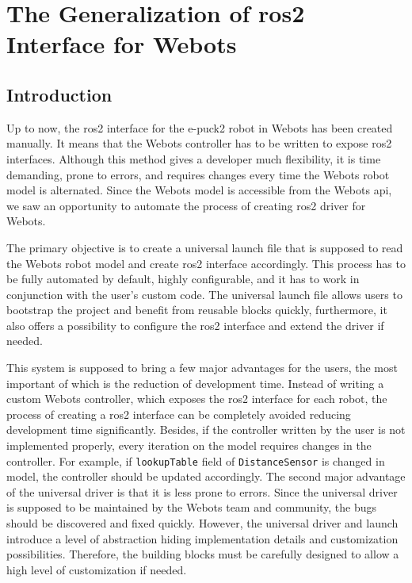 \chapter{The Generalization of \ac{ros2} Interface for Webots}
\label{chap:generalization}


\section{Introduction}
\label{sec:generalization:introduction}

Up to now, the \ac{ros2} interface for the e-puck2 robot in Webots has been created manually.
It means that the Webots controller has to be written to expose \ac{ros2} interfaces.
Although this method gives a developer much flexibility, it is time demanding, prone to errors, and requires changes every time the Webots robot model is alternated.
Since the Webots model is accessible from the Webots \ac{api}, we saw an opportunity to automate the process of creating \ac{ros2} driver for Webots.

The primary objective is to create a universal launch file that is supposed to read the Webots robot model and create \ac{ros2} interface accordingly.
This process has to be fully automated by default, highly configurable, and it has to work in conjunction with the user's custom code.
The universal launch file allows users to bootstrap the project and benefit from reusable blocks quickly, furthermore, it also offers a possibility to configure the \ac{ros2} interface and extend the driver if needed.

This system is supposed to bring a few major advantages for the users, the most important of which is the reduction of development time.
Instead of writing a custom Webots controller, which exposes the \ac{ros2} interface for each robot, the process of creating a \ac{ros2} interface can be completely avoided reducing development time significantly.
Besides, if the controller written by the user is not implemented properly, every iteration on the model requires changes in the controller.
For example, if \texttt{lookupTable} field of \texttt{DistanceSensor} is changed in model, the controller should be updated accordingly.
The second major advantage of the universal driver is that it is less prone to errors.
Since the universal driver is supposed to be maintained by the Webots team and community, the bugs should be discovered and fixed quickly.
However, the universal driver and launch introduce a level of abstraction hiding implementation details and customization possibilities.
Therefore, the building blocks must be carefully designed to allow a high level of customization if needed.

